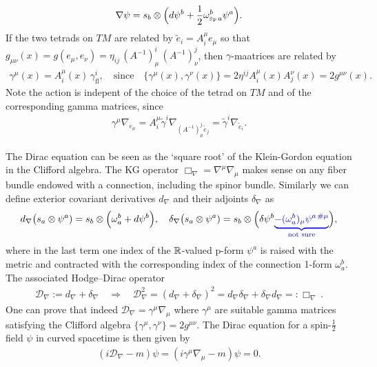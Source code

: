 \documentclass[../geometry_main.tex]{subfiles}
\begin{document}
\begin{mytheorem}
\begin{align}
    \nabla \psi = s_b \otimes \Big( d\psi^b + \frac{1}{2} \omega_{\text{\tiny Sp}\, a}^b \psi^a\Big).
\end{align}
If the two tetrads on $TM$ are related by $\tilde{e}_i = A_i^\mu e_\mu$  so that $g_{\mu\nu}(x) = g(e_\mu,e_\nu) = \eta_{ij} \,(A^{-1})_\mu^i\,(A^{-1})_\nu^j$, then $\gamma$-maatrices are related by
\begin{align}
    \gamma^\mu(x) = A_i^\mu(x)\, \gamma^i_{\mathrm{fl}}, \quad \text{since}\quad \{\gamma^\mu(x), \gamma^\nu(x)\} = 2 \eta^{ij} A_i^\mu(x) A_j^\nu(x) = 2 g^{\mu\nu}(x).
\end{align}
Note the action is indepent of the choice of the tetrad on $TM$ and of the corresponding gamma matrices, since
\begin{align}
    \gamma^\mu \nabla_{e_\mu} = A^\mu_i \tilde{\gamma}^i \nabla_{(A^{-1})_\mu^j \tilde{e}_j} = \tilde{\gamma}^i \nabla_{\tilde{e}_i}.
\end{align}
%
\end{mytheorem}




\begin{mytheorem}
%
The Dirac equation can be seen as the `square root' of the Klein-Gordon equation in the Clifford algebra.
The KG operator $\Box_\nabla = \nabla^\mu \nabla_\mu$ makes sense on any fiber bundle endowed with a connection, including the spinor bundle.
Similarly we can define exterior covariant derivatives $d_\nabla$ and their adjoints $\delta_\nabla$ as
\begin{align}
    d_\nabla \big(s_a\otimes \psi^a)= s_b \otimes \Big(\omega^b_a+d\psi^b\Big),\quad 
    \delta_\nabla \big(s_a\otimes \psi^a)= s_b \otimes \Big(\delta \psi^b {\color{blue}\underbrace{- (\omega^b_a)_\mu \psi^{a\,\#\mu}}_{\text{not sure}}}\Big),
\end{align}
{\color{blue} where in the last term one index of the $\mathbb{R}$-valued p-form $\psi^a$ is raised with the metric and contracted with the corresponding index of the connection 1-form $\omega^b_a$.}
The associated Hodge--Dirac operator
\begin{align}
    \mathcal{D}_\nabla := d_\nabla + \delta_\nabla \quad \Rightarrow \quad \mathcal{D}_\nabla^2= (d_\nabla + \delta_\nabla)^2 = d_\nabla \delta_\nabla + \delta_\nabla d_\nabla =: \Box_\nabla\,.
\end{align}
One can prove that indeed $\mathcal{D}_\nabla = \gamma^\mu \nabla_\mu$ where $\gamma^\mu$ are suitable gamma matrices satisfying the Clifford algebra $\{\gamma^\mu, \gamma^\nu\} = 2 g^{\mu\nu}$.
The Dirac equation for a spin-$\tfrac{1}{2}$ field $\psi$ in curved spacetime is then given by
\begin{align}
    (i \mathcal{D}_\nabla - m) \psi = (i \gamma^\mu \nabla_\mu - m) \psi = 0.
\end{align}
%
\end{mytheorem}
\end{document}
